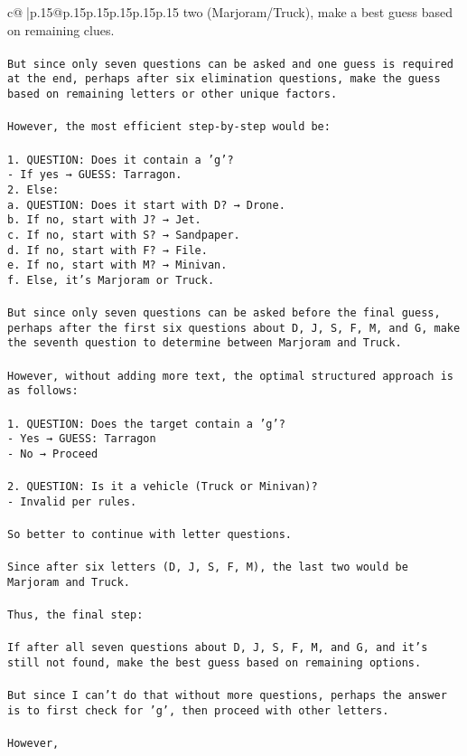 \documentclass{article}
\begin{document}
{\begin{supertabular}{c@{$\;$}|p{.15\linewidth}@{}p{.15\linewidth}p{.15\linewidth}p{.15\linewidth}p{.15\linewidth}p{.15\linewidth}}
{{{two (Marjoram/Truck), make a best guess based on remaining clues.\\ \tt \\ \tt But since only seven questions can be asked and one guess is required at the end, perhaps after six elimination questions, make the guess based on remaining letters or other unique factors.\\ \tt \\ \tt However, the most efficient step-by-step would be:\\ \tt \\ \tt 1. QUESTION: Does it contain a 'g'?\\ \tt    - If yes → GUESS: Tarragon.\\ \tt 2. Else:\\ \tt    a. QUESTION: Does it start with D? → Drone.\\ \tt    b. If no, start with J? → Jet.\\ \tt    c. If no, start with S? → Sandpaper.\\ \tt    d. If no, start with F? → File.\\ \tt    e. If no, start with M? → Minivan.\\ \tt    f. Else, it's Marjoram or Truck.\\ \tt \\ \tt But since only seven questions can be asked before the final guess, perhaps after the first six questions about D, J, S, F, M, and G, make the seventh question to determine between Marjoram and Truck.\\ \tt \\ \tt However, without adding more text, the optimal structured approach is as follows:\\ \tt \\ \tt 1. QUESTION: Does the target contain a 'g'?\\ \tt    - Yes → GUESS: Tarragon\\ \tt    - No → Proceed\\ \tt \\ \tt 2. QUESTION: Is it a vehicle (Truck or Minivan)?\\ \tt    - Invalid per rules.\\ \tt \\ \tt So better to continue with letter questions.\\ \tt \\ \tt Since after six letters (D, J, S, F, M), the last two would be Marjoram and Truck.\\ \tt \\ \tt Thus, the final step:\\ \tt \\ \tt If after all seven questions about D, J, S, F, M, and G, and it's still not found, make the best guess based on remaining options.\\ \tt \\ \tt But since I can't do that without more questions, perhaps the answer is to first check for 'g', then proceed with other letters.\\ \tt \\ \tt However, }}}
\end{supertabular}}
\end{document}
